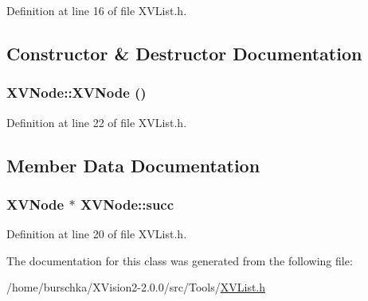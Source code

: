 Definition at line 16 of file XVList.h.

\subsection{Constructor \& Destructor Documentation}
\label{XVNode_a0}
\hypertarget{class_XVNode_a0}{
\subsubsection[XVNode]{\setlength{\rightskip}{0pt plus 5cm}XVNode::XVNode ()}}




Definition at line 22 of file XVList.h.

\subsection{Member Data Documentation}
\label{XVNode_m0}
\hypertarget{class_XVNode_m0}{
\subsubsection[succ]{\setlength{\rightskip}{0pt plus 5cm}XVNode $\ast$ XVNode::succ}}




Definition at line 20 of file XVList.h.

The documentation for this class was generated from the following file:\begin{CompactItemize}
\item 
/home/burschka/XVision2-2.0.0/src/Tools/\hyperlink{XVList.h-source}{XVList.h}\end{CompactItemize}
